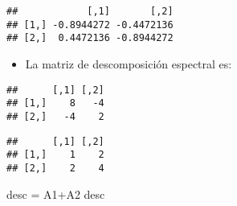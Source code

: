 \documentclass[
]{article}
\newenvironment{Shaded}{\begin{snugshade}}{\end{snugshade}}
\newcommand{\DecValTok}[1]{\textcolor[rgb]{0.00,0.00,0.81}{#1}}
\newcommand{\FunctionTok}[1]{\textcolor[rgb]{0.00,0.00,0.00}{#1}}
\newcommand{\NormalTok}[1]{#1}
\newcommand{\OtherTok}[1]{\textcolor[rgb]{0.56,0.35,0.01}{#1}}
\newcommand{\SpecialCharTok}[1]{\textcolor[rgb]{0.00,0.00,0.00}{#1}}
\providecommand{\tightlist}{%
  \setlength{\itemsep}{0pt}\setlength{\parskip}{0pt}}
\begin{document}
\begin{Shaded}
\end{Shaded}

\begin{verbatim}
##            [,1]       [,2]
## [1,] -0.8944272 -0.4472136
## [2,]  0.4472136 -0.8944272
\end{verbatim}

\begin{itemize}
\tightlist
\item
  La matriz de descomposición espectral es:
\end{itemize}

\begin{Shaded}
\end{Shaded}

\begin{verbatim}
##      [,1] [,2]
## [1,]    8   -4
## [2,]   -4    2
\end{verbatim}

\begin{Shaded}
\end{Shaded}

\begin{verbatim}
##      [,1] [,2]
## [1,]    1    2
## [2,]    2    4
\end{verbatim}

\begin{Shaded}
\begin{Highlighting}[]
\NormalTok{desc }\OtherTok{=}\NormalTok{ A1}\SpecialCharTok{+}\NormalTok{A2}
\NormalTok{desc}
\end{Highlighting}
\end{Shaded}
\end{document}
